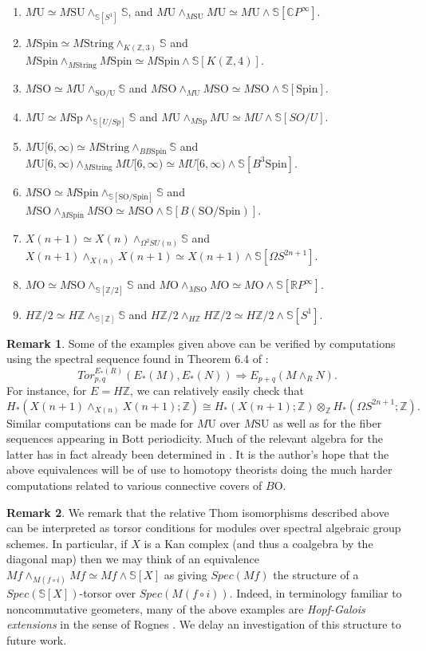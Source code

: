 \documentclass{article}
\theoremstyle{definition}
\newtheorem{rem}{Remark}
\theoremstyle{plain}
\newcommand{\ints}{\mathbb{Z}}
\newcommand{\sph}{\mathbb{S}}
\newcommand{\MString}{M\mathrm{String}}
\newcommand{\MSpin}{M\mathrm{Spin}}
\newcommand{\BO}{B\mathrm{O}}
\newcommand{\MO}{M\mathrm{O}}
\newcommand{\MU}{M\mathrm{U}}
\newcommand{\MSO}{M\mathrm{SO}}
\newcommand{\MSp}{M\mathrm{Sp}}
\newcommand{\MSU}{M\mathrm{SU}}
\newcommand{\Spin}{\mathrm{Spin}}
\newcommand{\SO}{\mathrm{SO}}
\newcommand{\U}{\mathrm{U}}
\begin{document}
\begin{enumerate}
\item $\MU\simeq \MSU\wedge_{\sph[S^1]}\sph$, and $\MU\wedge_{\MSU}\MU\simeq \MU\wedge \sph[\mathbb{C}P^\infty]$.
\item $\MSpin\simeq \MString\wedge_{K(\ints,3)}\sph$ and $\MSpin\wedge_{\MString}\MSpin\simeq \MSpin\wedge\sph[K(\ints,4)]$.
\item $\MSO\simeq\MU\wedge_{\SO/\U} \sph$ and $\MSO\wedge_{\MU}\MSO\simeq \MSO\wedge \sph[\Spin]$.
\item $\MU\simeq \MSp\wedge_{\sph[U/Sp]}\sph$ and $\MU\wedge_{\MSp}\MU\simeq MU\wedge\sph[SO/U]$.
\item $\MU[6,\infty)\simeq \MString\wedge_{BB\Spin}\sph$ and $\MU[6,\infty)\wedge_{\MString} MU[6,\infty)\simeq MU[6,\infty)\wedge\sph[B^3\Spin]$.
\item $ \MSO\simeq \MSpin\wedge_{\sph[\SO/\Spin]}\sph$ and $\MSO\wedge_{\MSpin}\MSO\simeq \MSO\wedge\sph[B(\SO/\Spin)]$.
\item $X(n+1)\simeq X(n)\wedge_{\Omega^2 SU(n)} \sph$ and $X(n+1)\wedge_{X(n)}X(n+1)\simeq X(n+1)\wedge\sph[\Omega S^{2n+1}]$.
\item $\MO\simeq \MSO\wedge_{\sph[\ints/2]}\sph$ and $\MO\wedge_{\MSO}\MO\simeq\MO\wedge\sph[\mathbb{R}P^\infty]$.
\item $H\ints/2\simeq H\ints\wedge_{\sph[\ints]}\sph$ and $H\ints/2\wedge_{H\ints}H\ints/2\simeq H\ints/2\wedge\sph[S^1]$.
\end{enumerate}


\begin{rem}\label{kunnsseq}
Some of the examples given above can be verified by computations using the spectral sequence found in Theorem 6.4 of \cite{ekmm}: $$Tor^{E_\ast(R)}_{p,q}(E_\ast(M),E_\ast(N))\Rightarrow E_{p+q}(M\wedge_RN).$$ For instance, for $E=H\ints$, we can relatively easily check that $$H_\ast(X(n+1)\wedge_{X(n)}X(n+1);\ints)\cong H_\ast(X(n+1);\ints)\otimes_{\ints} H_\ast(\Omega S^{2n+1};\ints).$$ Similar computations can be made for $\MU$ over $\MSU$ as well as for the fiber sequences appearing in Bott periodicity. Much of the relevant algebra for the latter has in fact already been determined in \cite{semcartbott}. It is the author's hope that the above equivalences will be of use to homotopy theorists doing the much harder computations related to various connective covers of $\BO$. 
\end{rem}

\begin{rem}
We remark that the relative Thom isomorphisms described above can be interpreted as torsor conditions for modules over spectral algebraic group schemes. In particular, if $X$ is a Kan complex (and thus a coalgebra by the diagonal map) then we may think of an equivalence $Mf\wedge_{M(f\circ i)} Mf\simeq Mf\wedge \sph[X]$ as giving $Spec(Mf)$ the structure of a  $Spec(\sph[X])$-torsor over $Spec(M(f\circ i))$. Indeed, in terminology familiar to noncommutative geometers, many of the above examples are \emph{Hopf-Galois extensions} in the sense of Rognes \cite{rog}. We delay an investigation of this structure to future work.  
\end{rem}
\end{document}
